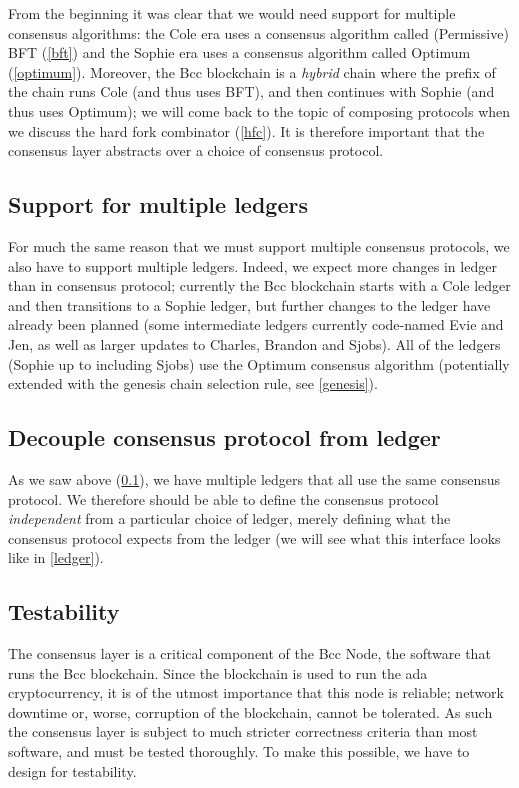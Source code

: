 From the beginning it was clear that we would need support for multiple
consensus algorithms: the Cole era uses a consensus algorithm called
(Permissive) BFT (\cref{bft}) and the Sophie era uses a consensus algorithm
called Optimum (\cref{optimum}). Moreover, the Bcc blockchain is a \emph{hybrid}
chain where the prefix of the chain runs Cole (and thus uses BFT), and then
continues with Sophie (and thus uses Optimum); we will come back to the topic of
composing protocols when we discuss the hard fork combinator (\cref{hfc}). It is
therefore important that the consensus layer abstracts over a choice of
consensus protocol.

\subsection{Support for multiple ledgers}
\label{multiple-ledgers}

For much the same reason that we must support multiple consensus protocols, we
also have to support multiple ledgers. Indeed, we expect more changes in ledger
than in consensus protocol; currently the Bcc blockchain starts with a
Cole ledger and then transitions to a Sophie ledger, but further changes to
the ledger have already been planned (some intermediate ledgers currently
code-named Evie and Jen, as well as larger updates to Charles, Brandon and
Sjobs). All of the ledgers (Sophie up to including Sjobs)
use the Optimum consensus algorithm (potentially extended with the genesis chain
selection rule, see \cref{genesis}).

\subsection{Decouple consensus protocol from ledger}
\label{decouple-consensus-ledger}

As we saw above (\cref{multiple-ledgers}), we have multiple ledgers that all
use the same consensus protocol. We therefore should be able to define the
consensus protocol \emph{independent} from a particular choice of ledger,
merely defining what the consensus protocol expects from the ledger
(we will see what this interface looks like in \cref{ledger}).

\subsection{Testability}
\label{testability}

The consensus layer is a critical component of the Bcc Node, the software
that runs the Bcc blockchain. Since the blockchain is used to run the ada
cryptocurrency, it is of the utmost importance that this node is reliable;
network downtime or, worse, corruption of the blockchain, cannot be tolerated.
As such the consensus layer is subject to much stricter correctness criteria
than most software, and must be tested thoroughly. To make this possible, we
have to design for testability.

